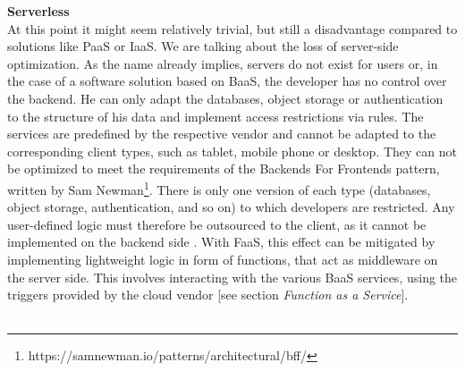 \documentclass[11pt]{article}
\begin{document}
\glqq \textbf{Serverless}\grqq{}\\
At this point it might seem relatively trivial, but still a disadvantage compared to solutions like PaaS or IaaS. We are talking about the loss of server-side optimization. As the name already implies, servers do not exist for users or, in the case of a software solution based on BaaS, the developer has no control over the backend. He can only adapt the databases, object storage or authentication to the structure of his data and implement access restrictions via rules. The services are predefined by the respective vendor and cannot be adapted to the corresponding client types, such as tablet, mobile phone or desktop. They can not be optimized to meet the requirements of the \glqq Backends For Frontends\grqq{} pattern, written by Sam Newman\footnote{https://samnewman.io/patterns/architectural/bff/}. There is only one version of each type (databases, object storage, authentication, and so on) to which developers are restricted. Any user-defined logic must therefore be outsourced to the client, as it cannot be implemented on the backend side \cite{fowler2018serverless}. With FaaS, this effect can be mitigated by implementing lightweight logic in form of functions, that act as middleware on the server side. This involves interacting with the various BaaS services, using the triggers provided by the cloud vendor [see section \textit{Function as a Service}].\\\\ 
\end{document}
